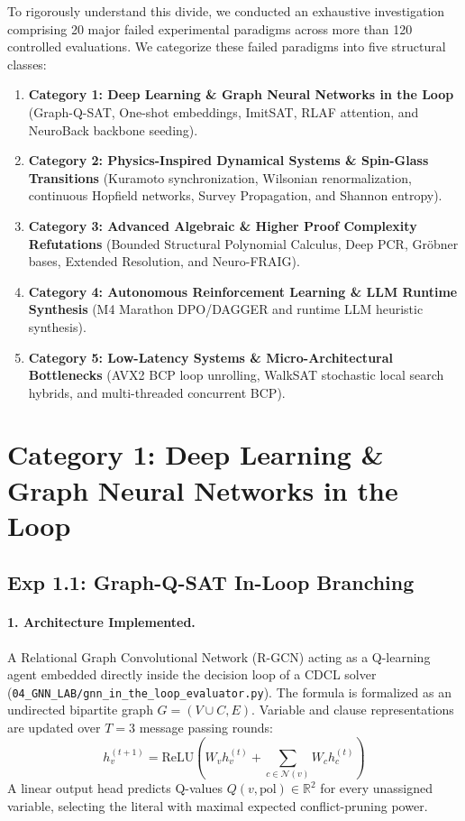 \documentclass[11pt]{article}
\theoremstyle{definition}
\begin{document}
To rigorously understand this divide, we conducted an exhaustive investigation comprising 20 major failed experimental paradigms across more than 120 controlled evaluations. We categorize these failed paradigms into five structural classes:
\begin{enumerate}
    \item \textbf{Category 1: Deep Learning \& Graph Neural Networks in the Loop} (Graph-Q-SAT, One-shot embeddings, ImitSAT, RLAF attention, and NeuroBack backbone seeding).
    \item \textbf{Category 2: Physics-Inspired Dynamical Systems \& Spin-Glass Transitions} (Kuramoto synchronization, Wilsonian renormalization, continuous Hopfield networks, Survey Propagation, and Shannon entropy).
    \item \textbf{Category 3: Advanced Algebraic \& Higher Proof Complexity Refutations} (Bounded Structural Polynomial Calculus, Deep PCR, Gröbner bases, Extended Resolution, and Neuro-FRAIG).
    \item \textbf{Category 4: Autonomous Reinforcement Learning \& LLM Runtime Synthesis} (M4 Marathon DPO/DAGGER and runtime LLM heuristic synthesis).
    \item \textbf{Category 5: Low-Latency Systems \& Micro-Architectural Bottlenecks} (AVX2 BCP loop unrolling, WalkSAT stochastic local search hybrids, and multi-threaded concurrent BCP).
\end{enumerate}

\newpage
\section{Category 1: Deep Learning \& Graph Neural Networks in the Loop}

\subsection{Exp 1.1: Graph-Q-SAT In-Loop Branching}
\paragraph{1. Architecture Implemented.}
A Relational Graph Convolutional Network (R-GCN) acting as a Q-learning agent embedded directly inside the decision loop of a CDCL solver (\texttt{04\_GNN\_LAB/gnn\_in\_the\_loop\_evaluator.py}). The formula is formalized as an undirected bipartite graph $G = (V \cup C, E)$. Variable and clause representations are updated over $T=3$ message passing rounds:
\begin{equation}
h_v^{(t+1)} = \text{ReLU}\left(W_v h_v^{(t)} + \sum_{c \in \mathcal{N}(v)} W_c h_c^{(t)}\right)
\end{equation}
A linear output head predicts Q-values $Q(v, \text{pol}) \in \mathbb{R}^2$ for every unassigned variable, selecting the literal with maximal expected conflict-pruning power.
\end{document}

